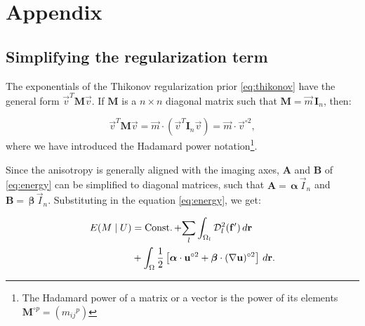 \renewcommand{\theequation}{A.\arabic{equation}}
\renewcommand{\thesubsection}{Appendix \arabic{subsection}}

\section*{Appendix}

\subsection{Simplifying the regularization term}\label{app:reg_term}
The exponentials of the Thikonov regularization prior \eqref{eq:thikonov} have the general form
  $\vec{v}^T \mathbf{M} \vec{v}$.
If $\mathbf{M}$ is a $n \times n$ diagonal matrix such that $\mathbf{M} = \vec{m} \, \mathbf{I}_n$, 
  then:

\begin{equation*}
\vec{v}^T \mathbf{M} \vec{v} = \vec{m} \cdot (\vec{v}^T \mathbf{I}_n \vec{v}) = \vec{m} \cdot \vec{v}^{\circ2},
\end{equation*}
%
  where we have introduced the Hadamard power notation\footnote{The Hadamard power of a matrix or a vector
  is the power of its elements $\mathbf{M}^{\circ p} = ({m_{ij}}^{p})$}.

Since the anisotropy is generally aligned with the imaging axes, 
  $\mathbf{A}$ and $\mathbf{B}$ of \eqref{eq:energy} can be simplified to diagonal matrices, such that
  $\mathbf{A}= \, \boldsymbol{\alpha}\,\vec{I}_n$ and
  $\mathbf{B}= \, \boldsymbol{\beta}\,\vec{I}_n$.
Substituting in the equation \eqref{eq:energy}, we get:

  \begin{align}
  E(M \mid U) &= \const + \underset{l}{\sum} \int_{\Omega_l}
  \mdist{f'}{l} \,d\vec{r} \notag\\
  &+ \int_{\Omega} \frac12 \left[ \boldsymbol{\alpha} \cdot \vec{u}^{\circ2} + \boldsymbol{\beta} \cdot (\nabla \vec{u})^{\circ2} \right] \,d\vec{r}.
  \label{eq:app_energy}
  \end{align}